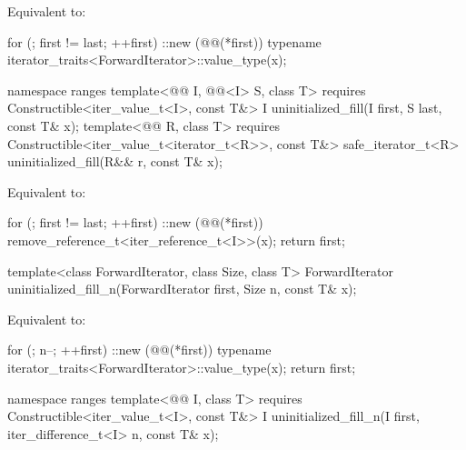 \begin{itemdescr}
\pnum
\effects
Equivalent to:
\begin{codeblock}
for (; first != last; ++first)
  ::new (@@(*first))
    typename iterator_traits<ForwardIterator>::value_type(x);
\end{codeblock}
\end{itemdescr}

%
\begin{itemdecl}
namespace ranges {
  template<@@ I, @@<I> S, class T>
      requires Constructible<iter_value_t<I>, const T&>
    I uninitialized_fill(I first, S last, const T& x);
  template<@@ R, class T>
      requires Constructible<iter_value_t<iterator_t<R>>, const T&>
    safe_iterator_t<R> uninitialized_fill(R&& r, const T& x);
}
\end{itemdecl}

\begin{itemdescr}
\effects Equivalent to:
\begin{codeblock}
for (; first != last; ++first) {
  ::new (@@(*first)) remove_reference_t<iter_reference_t<I>>(x);
}
return first;
\end{codeblock}
\end{itemdescr}

%
\begin{itemdecl}
template<class ForwardIterator, class Size, class T>
  ForwardIterator uninitialized_fill_n(ForwardIterator first, Size n, const T& x);
\end{itemdecl}

\begin{itemdescr}
\pnum
\effects
Equivalent to:
\begin{codeblock}
for (; n--; ++first)
  ::new (@@(*first))
    typename iterator_traits<ForwardIterator>::value_type(x);
return first;
\end{codeblock}
\end{itemdescr}

%
\begin{itemdecl}
namespace ranges {
  template<@@ I, class T>
      requires Constructible<iter_value_t<I>, const T&>
    I uninitialized_fill_n(I first, iter_difference_t<I> n, const T& x);
}
\end{itemdecl}

